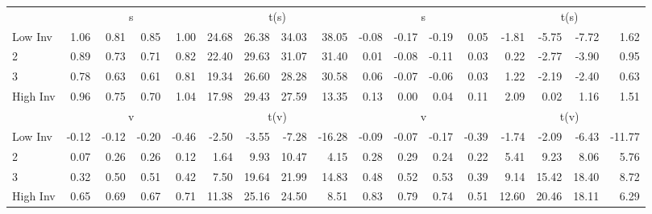 \begin{table}[!ht]
\begin{tabular}{lrrrrrrrrrrrrrrrr}
  
    
      & \multicolumn{4}{c}{s} & \multicolumn{4}{c}{t(s)}
    
      & \multicolumn{4}{c}{s} & \multicolumn{4}{c}{t(s)}
    
    \\
      \cmidrule(r){2-5} \cmidrule(r){6-9} \cmidrule(r){10-13} \cmidrule(r){14-17}

    Low Inv   & 1.06  & 0.81  & 0.85  & 1.00  & 24.68  & 26.38  & 34.03  & 38.05  & -0.08  & -0.17  & -0.19  & 0.05  & -1.81  & -5.75  & -7.72  & 1.62  \\
           2  & 0.89  & 0.73  & 0.71  & 0.82  & 22.40  & 29.63  & 31.07  & 31.40  & 0.01  & -0.08  & -0.11  & 0.03  & 0.22  & -2.77  & -3.90  & 0.95  \\
           3  & 0.78  & 0.63  & 0.61  & 0.81  & 19.34  & 26.60  & 28.28  & 30.58  & 0.06  & -0.07  & -0.06  & 0.03  & 1.22  & -2.19  & -2.40  & 0.63  \\
    High Inv  & 0.96  & 0.75  & 0.70  & 1.04  & 17.98  & 29.43  & 27.59  & 13.35  & 0.13  & 0.00  & 0.04  & 0.11  & 2.09  & 0.02  & 1.16  & 1.51  \\

  
    
      & \multicolumn{4}{c}{v} & \multicolumn{4}{c}{t(v)}
    
      & \multicolumn{4}{c}{v} & \multicolumn{4}{c}{t(v)}
    
    \\
      \cmidrule(r){2-5} \cmidrule(r){6-9} \cmidrule(r){10-13} \cmidrule(r){14-17}

    Low Inv   & -0.12  & -0.12  & -0.20  & -0.46  & -2.50  & -3.55  & -7.28  & -16.28  & -0.09  & -0.07  & -0.17  & -0.39  & -1.74  & -2.09  & -6.43  & -11.77  \\
           2  & 0.07  & 0.26  & 0.26  & 0.12  & 1.64  & 9.93  & 10.47  & 4.15  & 0.28  & 0.29  & 0.24  & 0.22  & 5.41  & 9.23  & 8.06  & 5.76  \\
           3  & 0.32  & 0.50  & 0.51  & 0.42  & 7.50  & 19.64  & 21.99  & 14.83  & 0.48  & 0.52  & 0.53  & 0.39  & 9.14  & 15.42  & 18.40  & 8.72  \\
    High Inv  & 0.65  & 0.69  & 0.67  & 0.71  & 11.38  & 25.16  & 24.50  & 8.51  & 0.83  & 0.79  & 0.74  & 0.51  & 12.60  & 20.46  & 18.11  & 6.29  \\

  

  \bottomrule
\end{tabular}
\label{tbl:32_Size_BM_Prior_FF1993}
\end{table}